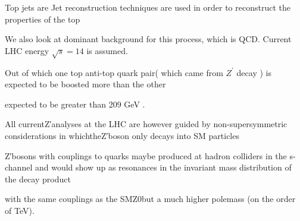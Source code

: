 \documentclass[12pt,a4paper]{article}		%
\begin{document}
   Top jets are Jet reconstruction techniques are used in order to reconstruct the properties of the top     

We also look at dominant background for this process, which is QCD.  Current LHC energy $\sqrt{s} = 14$ is assumed. 


Out of which one top anti-top quark pair( which came from $Z^\prime$ decay ) is expected to be boosted more than the other  


 
expected to be greater than 209 GeV .


  All currentZ′analyses at the LHC are however guided by non-supersymmetric considerations in whichtheZ′boson only decays into SM particles  

Z′bosons with couplings to quarks maybe produced at hadron colliders in the s-channel and would show up as resonances in the invariant mass distribution of the decay product
 

with  the  same  couplings  as  the  SMZ0but a much higher polemass (on the order of TeV).     
\end{document}
